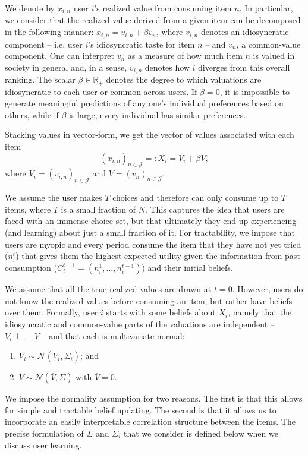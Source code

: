 \documentclass[manuscript, nonacm]{acmart}
\newcommand{\xhdr}[1]{\vspace{1mm} \noindent{\bf #1}}
\begin{document}
We denote by $x_{i,n}$ user $i$'s realized value from consuming item $n$. In particular, we consider that the realized value derived from a given item can be decomposed in the following manner: $x_{i,n}= v_{i,n} + \beta v_n$, where $v_{i,n}$ denotes an idiosyncratic component -- i.e. user $i$'s idiosyncratic taste for item $n$ --  and $v_{n}$, a common-value component. One can interpret $v_n$ as a measure of how much item $n$ is valued in society in general and, in a sense, $v_{i,n}$ denotes how $i$ diverges from this overall ranking. The scalar $\beta \in \mathbb{R}_{+}$ denotes the degree to which valuations are idiosyncratic to each user or common across users. If $\beta=0$, it is impossible to generate meaningful predictions of any one's individual preferences based on others, while if $\beta$ is large, every individual has similar preferences.
\par
Stacking values in vector-form, we get the vector of values associated with each item 
$${\left(x_{i,n}\right)}_{n \in \mathcal{J}}=:X_i =V_i+ \beta V, $$
where $V_i ={\left(v_{i,n}\right)}_{n \in \mathcal{J}}$ and $V={\left(v_{n}\right)}_{n \in \mathcal{J}}$.
\par
\xhdr{User Decision-Making.}
We assume the user makes $T$ choices and therefore can only consume up to $T$ items, where $T$ is a small fraction of $N$. This captures the idea that users are faced with an immense choice set, but that ultimately they end up experiencing (and learning) about just a small fraction of it. For tractability, we impose that users are myopic and every period consume the item that they have not yet tried ($n_i^t$) that gives them the highest expected utility given the information from past consumption ($C_i^{t-1}=(n_i^1,...,n_i^{t-1})$) and their initial beliefs.
\par
\xhdr{User Beliefs.} We assume that all the true realized values are drawn at $t = 0$. However, users do not know the realized values before consuming an item, but rather have beliefs over them.
Formally, user $i$ starts with some beliefs about $X_i$, namely that the idiosyncratic and common-value parts of the valuations are independent -- $V_i \perp \!\!\! \perp V$ -- and that each is multivariate normal: 
\begin{enumerate}[topsep=0pt]
\item $V_i \sim \mathcal N (\overline V_i, \Sigma_i)$; and 
\item $V \sim \mathcal N(\overline V, \Sigma)$ with $\overline V =0$.
\end{enumerate}
We impose the normality assumption for two reasons. The first is that this allows for simple and tractable belief updating. The second is that it allows us to incorporate an easily interpretable correlation structure between the items. The precise formulation of $\Sigma$ and $\Sigma_i$ that we consider is defined below when we discuss user learning.
\end{document}
